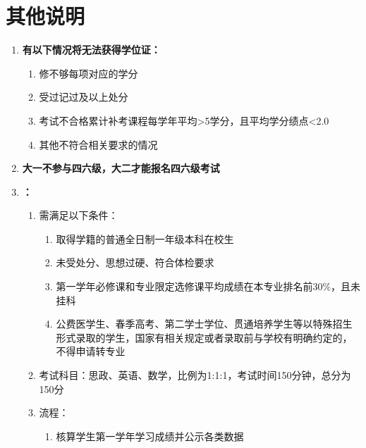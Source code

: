 \section[其他说明]{其他说明}
\begin{enumerate}
    \item \textbf{有以下情况将无法获得学位证：}
          \begin{enumerate}
              \item 修不够每项对应的学分
              \item 受过记过及以上处分
              \item 考试不合格累计补考课程每学年平均>5学分，且平均学分绩点<2.0
              \item 其他不符合相关要求的情况
          \end{enumerate}
    \item \textbf{大一不参与四六级，大二才能报名四六级考试}
    \item \textbf{\footnotemark：}
          \begin{enumerate}
              \item 需满足以下条件：
                    \begin{enumerate}
                        \item 取得学籍的普通全日制一年级本科在校生
                        \item 未受处分、思想过硬、符合体检要求
                        \item 第一学年必修课和专业限定选修课平均成绩在本专业排名前30\%，且未挂科
                        \item 公费医学生、春季高考、第二学士学位、贯通培养学生等以特殊招生形式录取的学生，国家有相关规定或者录取前与学校有明确约定的，不得申请转专业
                    \end{enumerate}
              \item 考试科目：思政、英语\footnotemark、数学，比例为1:1:1，考试时间150分钟，总分为150分
              \item 流程：
                    \begin{enumerate}
                        \item 核算学生第一学年学习成绩并公示各类数据

\end{enumerate}
\end{enumerate}
\end{enumerate}
